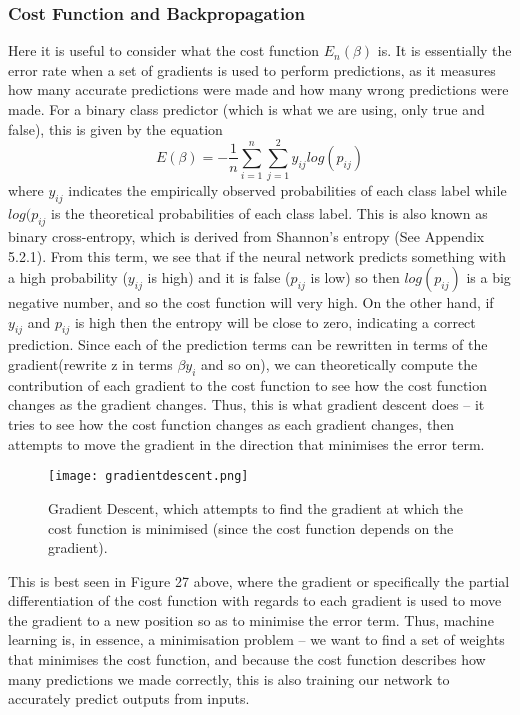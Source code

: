 \documentclass{article}
\begin{document}
\subsubsection{Cost Function and Backpropagation}
Here it is useful to consider what the cost function ${E_n}(\beta)$ is. It is essentially the error rate when a set of gradients is used to perform predictions, as it measures how many accurate predictions were made and how many wrong predictions were made. For a binary class predictor (which is what we are using, only true and false), this is given by the equation
\begin{equation}
E(\beta) = - \frac{1}{n}\sum_{i=1}^{n}{\sum_{j=1}^{2}y_{ij}log(p_{ij})}
\end{equation} 
where $y_{ij}$ indicates the empirically observed probabilities of each class label while $log(p_{ij}$ is the theoretical probabilities of each class label. This is also known as binary cross-entropy, which is derived from Shannon's entropy (See Appendix 5.2.1). From this term, we see that if the neural network predicts something with a high probability ($y_{ij}$ is high) and it is false ($p_{ij}$ is low) so then $log(p_{ij})$ is a big negative number, and so the cost function will very high. On the other hand, if $y_{ij}$ and $p_{ij}$ is high then the entropy will be close to zero, indicating a correct prediction. Since each of the prediction terms can be rewritten in terms of the gradient(rewrite z in terms $\beta y_i $ and so on), we can theoretically compute the contribution of each gradient to the cost function to see how the cost function changes as the gradient changes. Thus, this is what gradient descent does -- it tries to see how the cost function changes as each gradient changes, then attempts to move the gradient in the direction that minimises the error term.

\begin{figure}[H]
\texttt{[image: gradientdescent.png]}
\caption{Gradient Descent, which attempts to find the gradient at which the cost function is minimised (since the cost function depends on the gradient).}
\centering
\end{figure}
 This is best seen in Figure 27 above, where the gradient or specifically the partial differentiation of the cost function with regards to each gradient is used to move the gradient to a new position so as to minimise the error term. Thus, machine learning is, in essence, a minimisation problem -- we want to find a set of weights that minimises the cost function, and because the cost function describes how many predictions we made correctly, this is also training our network to accurately predict outputs from inputs.
\end{document}
